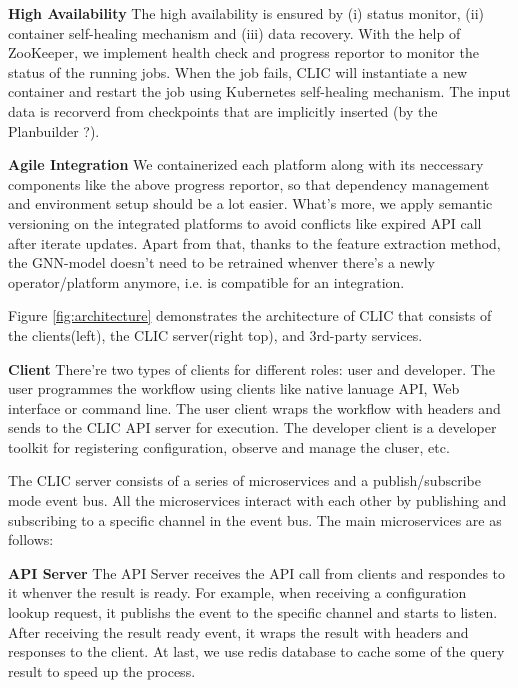 \textbf{High Availability}   The high availability is ensured by (i) status monitor, (ii) container self-healing mechanism and (iii) data recovery. With the help of ZooKeeper, we implement health check and progress reportor to monitor the status of the running jobs. When the job fails, CLIC will instantiate a new container and restart the job using Kubernetes self-healing mechanism. The input data is recorverd from checkpoints that are implicitly inserted (by the Planbuilder ?).

\textbf{Agile Integration}   We containerized each platform along with its neccessary components like the above progress reportor, so that dependency management and environment setup should be a lot easier. What's more, we apply semantic versioning on the integrated platforms to avoid conflicts like expired API call after iterate updates. Apart from that, thanks to the feature extraction method, the GNN-model doesn't need to be retrained whenver there's a newly operator/platform anymore, i.e. is compatible for an integration.

Figure \ref{fig:architecture} demonstrates the architecture of CLIC that consists of the clients(left), the CLIC server(right top), and 3rd-party services.

\textbf{Client}  There're two types of clients for different roles: user and developer. The user programmes the workflow using clients like native lanuage API, Web interface or command line. The user client wraps the workflow with headers and sends to the CLIC API server for execution. The developer client is a developer toolkit for registering configuration, observe and manage the cluser, etc.

The CLIC server consists of a series of microservices and a publish/subscribe mode event bus. All the microservices interact with each other by publishing and subscribing to a specific channel in the event bus. The main microservices are as follows:

\textbf{API Server}  The API Server receives the API call from clients and respondes to it whenver the result is ready. For example, when receiving a configuration lookup request, it publishs the event to the specific channel and starts to listen. After receiving the result ready event, it wraps the result with headers and responses to the client. At last, we use redis database to cache some of the query result to speed up the process.

